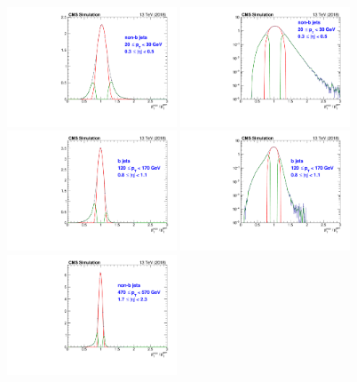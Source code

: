 \begin{figure}[htbp]
  \begin{center}
    \includegraphics[width=0.45\textwidth]{figs/jetmet/pt01_eta01_nonbjets_lin.pdf}
    \includegraphics[width=0.45\textwidth]{figs/jetmet/pt01_eta01_nonbjets_log.pdf} \\
    \includegraphics[width=0.45\textwidth]{figs/jetmet/pt05_eta03_bjets_lin.pdf}
    \includegraphics[width=0.45\textwidth]{figs/jetmet/pt05_eta03_bjets_log.pdf} \\
    \includegraphics[width=0.45\textwidth]{figs/jetmet/pt10_eta06_nonbjets_lin.pdf}

\end{center}
\end{figure}
